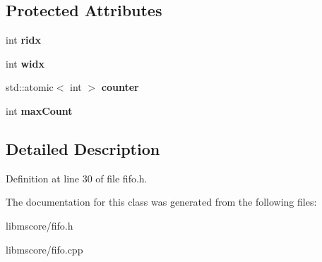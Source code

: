 \subsection*{Protected Attributes}
\begin{DoxyCompactItemize}
\item 
\mbox{\label{class_ms_1_1_fifo_base_af71f7d3e2a1401b11d69136b90dcaffe}} 
int {\bfseries ridx}
\item 
\mbox{\label{class_ms_1_1_fifo_base_a1cb2ec032f1779614da462a2f55f140d}} 
int {\bfseries widx}
\item 
\mbox{\label{class_ms_1_1_fifo_base_a6037a2b5e989e0c2f13e7d2e3bcab067}} 
std\+::atomic$<$ int $>$ {\bfseries counter}
\item 
\mbox{\label{class_ms_1_1_fifo_base_a9b0b6fb529f69cbbe902822a9aa705c8}} 
int {\bfseries max\+Count}
\end{DoxyCompactItemize}


\subsection{Detailed Description}


Definition at line 30 of file fifo.\+h.



The documentation for this class was generated from the following files\+:\begin{DoxyCompactItemize}
\item 
libmscore/fifo.\+h\item 
libmscore/fifo.\+cpp\end{DoxyCompactItemize}
